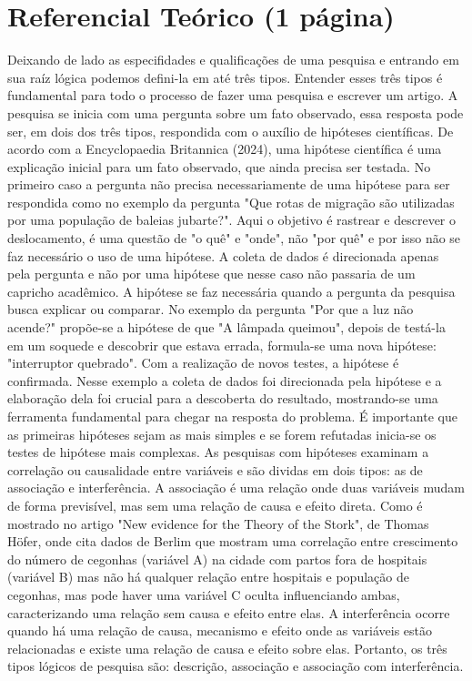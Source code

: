 \section{\esp Referencial Teórico (1 página)}
Deixando de lado as especifidades e qualificações de uma pesquisa e entrando em sua raíz lógica podemos defini-la em até três tipos. Entender esses três tipos é fundamental para todo o processo de fazer uma pesquisa e escrever um artigo. A pesquisa se inicia com uma pergunta sobre um fato observado, essa resposta pode ser, em dois dos três tipos, respondida com o auxílio de hipóteses científicas. De acordo com a Encyclopaedia Britannica (2024)\cite{britannica2024}, uma hipótese científica é uma explicação inicial para um fato observado, que ainda precisa ser testada. No primeiro caso a pergunta não precisa necessariamente de uma hipótese para ser respondida como no exemplo da pergunta "Que rotas de migração são utilizadas por uma população de baleias jubarte?". Aqui o objetivo é rastrear e descrever o deslocamento, é uma questão de "o quê" e "onde", não "por quê" e por isso não se faz necessário o uso de uma hipótese. A coleta de dados é direcionada apenas pela pergunta e não por uma hipótese que nesse caso não passaria de um capricho acadêmico.  A hipótese se faz necessária quando a pergunta da pesquisa busca explicar ou comparar. No exemplo da pergunta "Por que a luz não acende?" propõe-se a hipótese de que "A lâmpada queimou", depois de testá-la em um soquede e descobrir que estava errada, formula-se uma nova hipótese: "interruptor quebrado". Com a realização de novos testes, a hipótese é confirmada. Nesse exemplo a coleta de dados foi direcionada pela hipótese e a elaboração dela foi crucial para a descoberta do resultado, mostrando-se uma ferramenta fundamental para chegar na resposta do problema. É importante que as primeiras hipóteses sejam as mais simples e se forem refutadas inicia-se os testes de hipótese mais complexas. As pesquisas com hipóteses examinam a correlação ou causalidade entre variáveis e são dividas em dois tipos: as de associação e interferência. A associação é uma relação onde duas variáveis mudam de forma previsível, mas sem uma relação de causa e efeito direta. Como é mostrado no artigo "New evidence for the Theory of the Stork"\cite{hofer2004}, de Thomas Höfer, onde cita dados de Berlim que mostram uma correlação entre crescimento do número de cegonhas (variável A) na cidade com partos fora de hospitais (variável B) mas não há qualquer relação entre hospitais e população de cegonhas, mas pode haver uma variável C oculta influenciando ambas, caracterizando uma relação sem causa e efeito entre elas. A interferência ocorre quando há uma relação de causa, mecanismo e efeito onde as variáveis estão relacionadas e existe uma relação de causa e efeito sobre elas. Portanto, os três tipos lógicos de pesquisa são: descrição, associação e associação com interferência.




